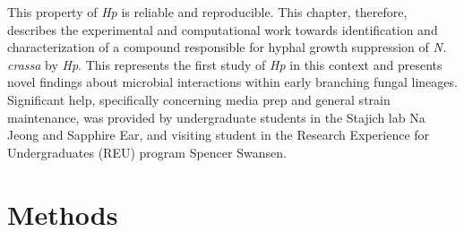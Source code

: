 \indent This property of \textit{Hp} is reliable and reproducible. This chapter, therefore, describes the experimental and computational work towards identification and characterization of a compound responsible for hyphal growth suppression of \textit{N. crassa} by \textit{Hp}. This represents the first study of \textit{Hp} in this context and presents novel findings about microbial interactions within early branching fungal lineages. Significant help, specifically concerning media prep and general strain maintenance, was provided by undergraduate students in the Stajich lab Na Jeong and Sapphire Ear, and visiting student in the Research Experience for Undergraduates (REU) program Spencer Swansen.\\
\section{Methods}
